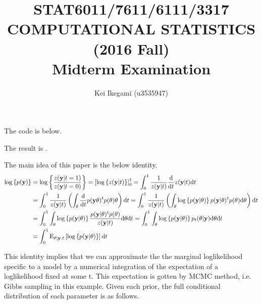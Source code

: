 \documentclass{article}
\begin{document}
\title{STAT6011/7611/6111/3317 \\ 
COMPUTATIONAL STATISTICS (2016 Fall)\\
Midterm Examination}
\author{Kei Ikegami (u3535947)}
\maketitle

\section{}
The code is below.

The result is .
\par
The main idea of this paper is the below identity.
\begin{align*}
	{\rm log} \left\{ p({\bf y}) \right\} &= {\rm log} \left\{ \frac{z({\bf y}| t=1)}{z({\bf y} | t=0)} \right\} = \left[ {\rm log}\left\{z({\bf y} | t)\right\} \right]_0^1 = \int_0^1 \frac{1}{z({\bf y} | t)} \frac{\mathrm{d}}{\mathrm{d} t} z({\bf y} | t) \mathrm{d}t\\
	&= \int_0^1 \frac{1}{z({\bf y} | t)} \left( \int_{\theta} \frac{\mathrm{d}}{\mathrm{d}t} p({\bf y}\theta)^t p(\theta) \mathrm{\theta} \right) \mathrm{d}t = \int_0^1 \frac{1}{z({\bf y} | t)} \left( \int_{\theta} {\rm log} \left\{ p({\bf y} | \theta) \right\} p({\bf y} | \theta)^t p(\theta) \mathrm{d}\theta \right) \mathrm{d} t\\
	&= \int_0^1 \int_{\theta} {\rm log} \left\{ p({\bf y} | \theta) \right\} \frac{p({\bf y} | \theta)^t p(\theta)}{z({\bf y} | t)} \mathrm{d} \theta \mathrm{d} t = \int_0^1 \int_{\theta} {\rm log} \left\{ p({\bf y} | \theta) \right\} p_t(\theta | {\bf y}) \mathrm{d} \theta \mathrm{d} t\\
	&= \int_0^1 {\rm E}_{\theta | {\bf y}, t} \left[ {\rm log}\left\{ p({\bf y} | \theta) \right\} \right] \mathrm{d}t
\end{align*}

This identity implies that we can approximate the the marginal loglikelihood specific to a model by a numerical integration of the expectation of a loglikelihood fixed at some t. This expectation is gotten by MCMC method, i.e. Gibbs sampling in this example. Given each prior, the full conditional distribution of each parameter is as follows. 
\end{document}
